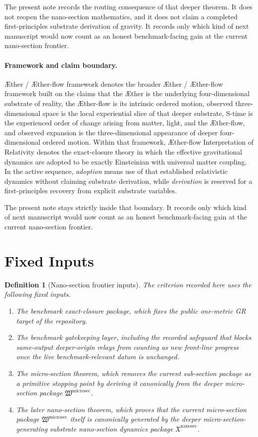 \documentclass[11pt]{article}
\newcommand{\Aether}{\AE{}ther}
\newcommand{\Aflow}{\AE{}ther-flow}
\newcommand{\TheoryName}{\Aflow{} Interpretation of Relativity}
\newcommand{\TheoryProgram}{\Aether{} / \Aflow{} framework}
\newcommand{\MicroSectionPackage}{\mathfrak W^{\mathrm{microsec}}}
\newcommand{\NanoSectionPackage}{\mathfrak X^{\mathrm{nanosec}}}
\newtheorem{definition}{Definition}
\begin{document}
The present note records the routing consequence of that deeper theorem. It does not reopen the nano-section mathematics, and it does not claim a completed first-principles substrate derivation of gravity. It records only which kind of next manuscript would now count as an honest benchmark-facing gain at the current nano-section frontier.

\paragraph{Framework and claim boundary.}
\TheoryProgram{} denotes the broader \Aether{} / \Aflow{} framework built on the claims that the \Aether{} is the underlying four-dimensional substrate of reality, the \Aflow{} is its intrinsic ordered motion, observed three-dimensional space is the local experiential slice of that deeper substrate, S-time is the experienced order of change arising from matter, light, and the \Aflow{}, and observed expansion is the three-dimensional appearance of deeper four-dimensional ordered motion. Within that framework, \TheoryName{} denotes the exact-closure theory in which the effective gravitational dynamics are adopted to be exactly Einsteinian with universal matter coupling. In the active sequence, \emph{adoption} means use of that established relativistic dynamics without claiming substrate derivation, while \emph{derivation} is reserved for a first-principles recovery from explicit substrate variables.

The present note stays strictly inside that boundary. It records only which kind of next manuscript would now count as an honest benchmark-facing gain at the current nano-section frontier.

\section{Fixed Inputs}

\begin{definition}[Nano-section frontier inputs]
The criterion recorded here uses the following fixed inputs.
\begin{enumerate}
    \item The benchmark exact-closure package, which fixes the public one-metric GR target of the repository.
    \item The benchmark gatekeeping layer, including the recorded safeguard that blocks same-output deeper-origin relays from counting as new front-line progress once the live benchmark-relevant datum is unchanged.
    \item The micro-section theorem, which removes the current sub-section package as a primitive stopping point by deriving it canonically from the deeper micro-section package \(\MicroSectionPackage\).
    \item The later nano-section theorem, which proves that the current micro-section package \(\MicroSectionPackage\) itself is canonically generated by the deeper micro-section-generating substrate nano-section dynamics package \(\NanoSectionPackage\).
\end{enumerate}
\end{definition}
\end{document}
